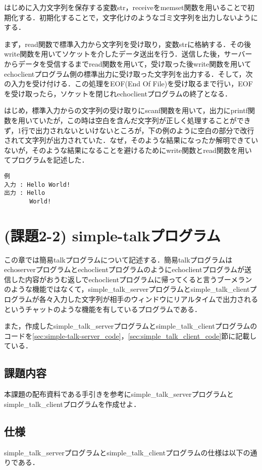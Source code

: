 \documentclass[a4j]{jarticle}
\newcommand{\esp}{echoserverプログラム}
\newcommand{\ecp}{echoclientプログラム}
\newcommand{\sts}{simple\_talk\_serverプログラム}
\newcommand{\stc}{simple\_talk\_clientプログラム}
\begin{document}
はじめに入力文字列を保存する変数str，receiveをmemset関数を用いることで初期化する．初期化することで，文字化けのようなゴミ文字列を出力しないようにする．

まず，read関数で標準入力から文字列を受け取り，変数strに格納する．その後write関数を用いてソケットを介したデータ送出を行う．送信した後，サーバーからデータを受信するまでread関数を用いて，受け取った後write関数を用いて\ecp 側の標準出力に受け取った文字列を出力する．そして，次の入力を受け付ける．この処理をEOF(End Of File)を受け取るまで行い，EOFを受け取ったら，ソケットを閉じれ\ecp の終了となる．

はじめ，標準入力からの文字列の受け取りにscanf関数を用いて，出力にprintf関数を用いていたが，この時は空白を含んだ文字列が正しく処理することができず，1行で出力されないといけないところが，下の例のように空白の部分で改行されて文字列が出力されていた．なぜ，そのような結果になったか解明できていないが，そのような結果になることを避けるためにwrite関数とread関数を用いてプログラムを記述した．

\begin{verbatim}
例
入力 : Hello World!
出力 : Hello
       World!
\end{verbatim}

\section{(課題2-2) simple-talkプログラム}

この章では簡易talkプログラムについて記述する．簡易talkプログラムは\esp と\ecp のように\ecp が送信した内容がおうむ返しで\ecp に帰ってくると言うブーメランのような機能ではなくて，\sts と\stc が各々入力した文字列が相手のウィンドウにリアルタイムで出力されるというチャットのような機能を有しているプログラムである．

また，作成した\sts と\stc のコードを\ref{sec:simple-talk-server_code}，\ref{sec:simple_talk_client_code}節に記載している．

\subsection{課題内容}

本課題の配布資料である手引きを参考に\sts と\stc を作成せよ．

\subsection{仕様}

\sts と\stc の仕様は以下の通りである．
\end{document}

